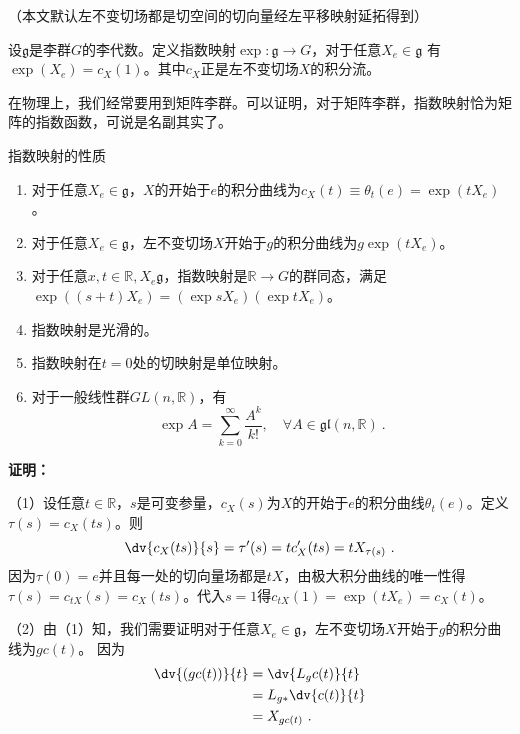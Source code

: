 
（本文默认左不变切场都是切空间的切向量经左平移映射延拓得到）
\begin{definition}{}
设$\mathfrak g$是李群$G$的李代数。定义指数映射$\exp :\mathfrak g\to G$，对于任意$X_e\in \mathfrak g$ 有$\exp (X_e)=c_X(1)$。其中$c_X$正是左不变切场$X$的积分流。
\end{definition}
在物理上，我们经常要用到矩阵李群。可以证明，对于矩阵李群，指数映射恰为矩阵的指数函数，可说是名副其实了。

\begin{theorem}{指数映射的性质}
\begin{enumerate}
\item 对于任意$X_e\in \mathfrak g$，$X$的开始于$e$的积分曲线为$c_X(t)\equiv\theta_t(e)=\exp (tX_e)$。
\item 对于任意$X_e\in \mathfrak g$，左不变切场$X$开始于$g$的积分曲线为$g\exp (tX_e)$。
\item 对于任意$x,t\in\mathbb R,X_e\mathfrak g$，指数映射是$\mathbb R\to G$的群同态，满足$\exp ((s+t)X_e)=(\exp sX_e)(\exp tX_e)$。

\item 指数映射是光滑的。
\item 指数映射在$t=0$处的切映射是单位映射。
\item 对于一般线性群$GL(n,\mathbb R)$，有
\begin{equation}
\exp  A=\sum_{k=0}^\infty\frac{A^k}{k!},\quad \forall A\in\mathfrak{gl}(n,\mathbb{R})~.
\end{equation}
\end{enumerate}
\end{theorem}

\textbf{证明：}

（1）设任意$t\in \mathbb R$，$s$是可变参量，$c_X(s)$为$X$的开始于$e$的积分曲线$\theta_t(e)$。定义$\tau(s)=c_X(ts)$。则
\begin{equation}
\dv{c_X(ts)}{s}=\tau'(s)=tc'_X(ts)=tX_{\tau (s)}~.
\end{equation}
因为$\tau(0)=e$并且每一处的切向量场都是$tX$，由极大积分曲线的唯一性得$\tau(s)=c_{tX}(s)=c_X(ts)$。代入$s=1$得$c_{tX}(1)=\exp(tX_e)=c_X(t)$。

（2）由（1）知，我们需要证明对于任意$X_e\in \mathfrak g$，左不变切场$X$开始于$g$的积分曲线为$gc(t)$。
因为
\begin{equation}
\begin{aligned}
\dv{(gc(t))}{t}&=\dv{L_gc(t)}{t}\\
&=L_{g*}\dv{c(t)}{t}\\
&=X_{gc(t)}~.
\end{aligned}
\end{equation}

